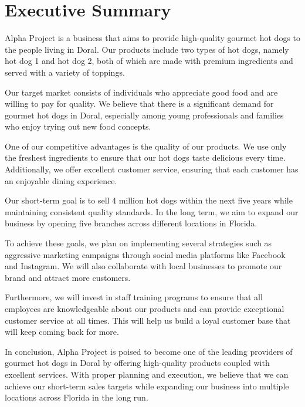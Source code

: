 \section{Executive Summary}\label{sec:executive-summary}

Alpha Project is a business that aims to provide high-quality gourmet hot dogs to the people living in Doral. Our products include two types of hot dogs, namely hot dog 1 and hot dog 2, both of which are made with premium ingredients and served with a variety of toppings.

Our target market consists of individuals who appreciate good food and are willing to pay for quality. We believe that there is a significant demand for gourmet hot dogs in Doral, especially among young professionals and families who enjoy trying out new food concepts.

One of our competitive advantages is the quality of our products. We use only the freshest ingredients to ensure that our hot dogs taste delicious every time. Additionally, we offer excellent customer service, ensuring that each customer has an enjoyable dining experience.

Our short-term goal is to sell 4 million hot dogs within the next five years while maintaining consistent quality standards. In the long term, we aim to expand our business by opening five branches across different locations in Florida.

To achieve these goals, we plan on implementing several strategies such as aggressive marketing campaigns through social media platforms like Facebook and Instagram. We will also collaborate with local businesses to promote our brand and attract more customers.

Furthermore, we will invest in staff training programs to ensure that all employees are knowledgeable about our products and can provide exceptional customer service at all times. This will help us build a loyal customer base that will keep coming back for more.

In conclusion, Alpha Project is poised to become one of the leading providers of gourmet hot dogs in Doral by offering high-quality products coupled with excellent services. With proper planning and execution, we believe that we can achieve our short-term sales targets while expanding our business into multiple locations across Florida in the long run.